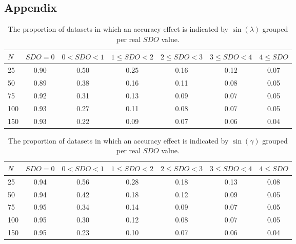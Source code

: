 \documentclass[11pt,]{article}
\begin{document}
\begin{appendices}
\section{Appendix}\label{Appendix}

\begin{table}[ht]
\centering
\caption{The proportion of datasets in which an accuracy effect is indicated by $\sin(\lambda)$ grouped per real $SDO$ value.} 
\begin{tabular}{lcccccc}
  \noalign{\smallskip}\hline\noalign{\smallskip}
$N$ & $SDO = 0$ & $ 0 < SDO < 1$ & $1 \leq SDO < 2$ & $2 \leq SDO < 3$ &  $3 \leq SDO < 4$ & $4 \leq SDO$\\ \hline\noalign{\smallskip}
25 & 0.90 & 0.50 & 0.25 & 0.16 & 0.12 & 0.07\\
50 & 0.89 & 0.38 & 0.16 & 0.11 & 0.08 & 0.05\\
75 & 0.92 & 0.31 & 0.13 & 0.09 & 0.07 & 0.05\\
100& 0.93 & 0.27 & 0.11 & 0.08 & 0.07 & 0.05\\
150& 0.93 & 0.22 & 0.09 & 0.07 & 0.06 & 0.04\\
   \hline
\end{tabular}
\label{TableResdetmin}
\end{table}

\begin{table}[ht]
\centering
\caption{The proportion of datasets in which an accuracy effect is indicated by $\sin(\gamma)$ grouped per real $SDO$ value.} 
\begin{tabular}{lcccccc}
  \noalign{\smallskip}\hline\noalign{\smallskip}
$N$ & $SDO = 0$ & $ 0 < SDO < 1$ & $1 \leq SDO < 2$ & $2 \leq SDO < 3$ &  $3 \leq SDO < 4$ & $4 \leq SDO$\\ \hline\noalign{\smallskip}
25 & 0.94 & 0.56 & 0.28 & 0.18 & 0.13 & 0.08 \\
50 & 0.94 & 0.42 & 0.18 & 0.12 & 0.09 & 0.05 \\
75 & 0.95 & 0.34 & 0.14 & 0.09 & 0.07 & 0.05 \\
100& 0.95 & 0.30 & 0.12 & 0.08 & 0.07 & 0.05 \\
150& 0.95 & 0.23 & 0.10 & 0.07 & 0.06 & 0.04 \\
   \hline
\end{tabular}
\label{TableResdetmax}
\end{table}


\end{appendices}
\end{document}
